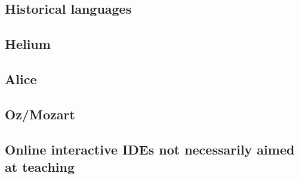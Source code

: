 \subsection{Historical languages}

\subsection{Helium}

\subsection{Alice}

\subsection{Oz/Mozart}

\subsection{Online interactive IDEs not necessarily aimed at teaching}
